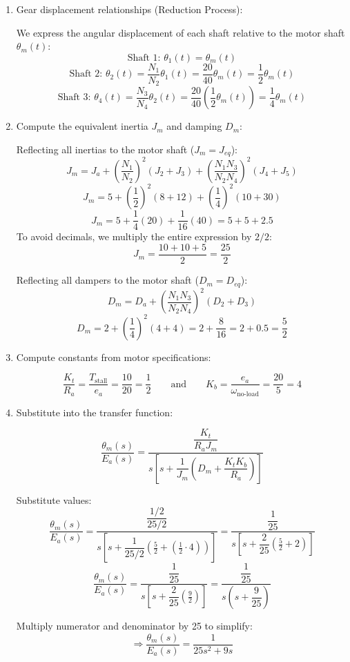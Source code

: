 \documentclass[11pt]{article}
\begin{document}
\begin{enumerate}[label=(\alph*), itemindent=*, leftmargin=*, nolistsep]
    
    \item Gear displacement relationships (Reduction Process):
    
    We express the angular displacement of each shaft relative to the motor shaft $\theta_m(t)$:
    \[
    \text{Shaft 1: } \theta_1(t) = \theta_m(t)
    \]
    \[
    \text{Shaft 2: } \theta_2(t) = \frac{N_1}{N_2} \theta_1(t) = \frac{20}{40} \theta_m(t) = \frac{1}{2} \theta_m(t)
    \]
    \[
    \text{Shaft 3: } \theta_4(t) = \frac{N_3}{N_4} \theta_2(t) = \frac{20}{40} \left( \frac{1}{2} \theta_m(t) \right) = \frac{1}{4} \theta_m(t)
    \]
    
    \item Compute the equivalent inertia \( J_m \) and damping \( D_m \):
    
    Reflecting all inertias to the motor shaft ($J_m = J_{eq}$):
    \[
    J_m = J_a + \left( \frac{N_1}{N_2} \right)^2 (J_2 + J_3) + \left( \frac{N_1 N_3}{N_2 N_4} \right)^2 (J_4 + J_5)
    \]
    \[
    J_m = 5 + \left( \frac{1}{2} \right)^2 (8 + 12) + \left( \frac{1}{4} \right)^2 (10 + 30)
    \]
    \[
    J_m = 5 + \frac{1}{4}(20) + \frac{1}{16}(40) = 5 + 5 + 2.5
    \]
    To avoid decimals, we multiply the entire expression by $2/2$:
    \[
    J_m = \frac{10 + 10 + 5}{2} = \boxed{\frac{25}{2}}
    \]
    
    Reflecting all dampers to the motor shaft ($D_m = D_{eq}$):
    \[
    D_m = D_a + \left( \frac{N_1 N_3}{N_2 N_4} \right)^2 (D_2 + D_3)
    \]
    \[
    D_m = 2 + \left( \frac{1}{4} \right)^2 (4 + 4) = 2 + \frac{8}{16} = 2 + 0.5 = \boxed{\frac{5}{2}}
    \]
    
    \item Compute constants from motor specifications:
    
    \[
    \frac{K_t}{R_a} = \frac{T_{\text{stall}}}{e_a} = \frac{10}{20} = \frac{1}{2}
    \qquad \text{and} \qquad
    K_b = \frac{e_a}{\omega_{\text{no-load}}} = \frac{20}{5} = 4
    \]
    
    \item Substitute into the transfer function:
    
    \[
    \frac{\theta_m(s)}{E_a(s)} = \frac{\dfrac{K_t}{R_a J_m}}{s \left[ s + \dfrac{1}{J_m} \left( D_m + \dfrac{K_t K_b}{R_a} \right) \right]}
    \]
    
    Substitute values:
    \[
    \frac{\theta_m(s)}{E_a(s)} = \frac{\dfrac{1/2}{25/2}}{s \left[ s + \dfrac{1}{25/2} \left( \frac{5}{2} + \left( \frac{1}{2} \cdot 4 \right) \right) \right]} = \frac{\dfrac{1}{25}}{s \left[ s + \dfrac{2}{25} \left( \frac{5}{2} + 2 \right) \right]}
    \]
    \[
    \frac{\theta_m(s)}{E_a(s)} = \frac{\dfrac{1}{25}}{s \left[ s + \dfrac{2}{25} \left( \frac{9}{2} \right) \right]} = \frac{\dfrac{1}{25}}{s \left( s + \dfrac{9}{25} \right)}
    \]
    
    Multiply numerator and denominator by 25 to simplify:
    \[
    \Rightarrow
    \boxed{
        \frac{\theta_m(s)}{E_a(s)} = \frac{1}{25s^2 + 9s}
    }
    \]
    
\end{enumerate}
\end{document}

